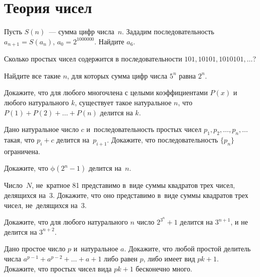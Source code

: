 
\section*{Теория чисел}


\begingroup
    \ifx\mathup\undefined
        \def\eulerphi{\upphi}
    \else
        \def\eulerphi{\mathrm{\phi}}
    \fi

\begin{problems}

\item
Пусть $S(n)$~--- сумма цифр числа~$n$.
Зададим последовательность $a_{n+1} = S(a_n)$, $a_0 = 2^{1000000}$.
Найдите $a_6$.

\item
Сколько простых чисел содержится в последовательности
$101, 10101, 1010101, \ldots$?

\item
Найдите все такие $n$, для которых сумма цифр числа $5^n$ равна $2^n$.

\item
Докажите, что для любого многочлена с целыми коэффициентами $P(x)$ и любого
натурального $k$, существует такое натуральное $n$, что
$P(1) + P(2) + \ldots + P(n)$ делится на $k$.

\item
Дано натуральное число $c$ и~последовательность простых чисел
$p_1, p_2, \ldots, p_n, \ldots$ такая, что $p_i + c$ делится на~$p_{i+1}$.
Докажите, что последовательность $\{p_n\}$ ограничена.

\item
Докажите, что $\eulerphi(2^n - 1)$ делится на~$n$.

\item
Число~$N$, не~кратное 81 представимо в~виде суммы квадратов трех чисел,
делящихся на~3.
Докажите, что оно представимо в~виде суммы квадратов трех чисел, не~делящихся
на~3.

\item
Докажите, что для любого натурального $n$ число $2^{3^n} + 1$ делится
на $3^{n+1}$, и не делится на $3^{n+2}$.

\item
\subproblem
Дано простое число $p$ и~натуральное $a$.
Докажите, что любой простой делитель числа $a^{p-1} + a^{p-2} + \ldots + a + 1$
либо равен $p$, либо имеет вид $p k + 1$.
\\
\subproblem
Докажите, что простых чисел вида $p k + 1$ бесконечно много.

\end{problems}

\endgroup %

